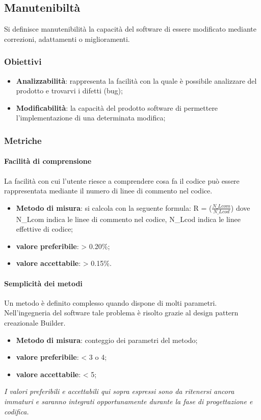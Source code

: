 \subsection{Manutenibiltà}
Si definisce manutenibilità la capacità del software di essere modificato mediante correzioni, adattamenti o miglioramenti.

\subsubsection{Obiettivi}
\begin{itemize}
\item \textbf{Analizzabilità}: rappresenta la facilità con la quale è possibile analizzare del prodotto e trovarvi i difetti (bug);
\item \textbf{Modificabilità}: la capacità del prodotto software di permettere l'implementazione di una determinata modifica;
\end{itemize}

\subsubsection{Metriche}

\paragraph{Facilità di comprensione}
La facilità con cui l’utente riesce a comprendere cosa fa il codice può essere rappresentata mediante il numero di linee di commento nel codice.
\begin{itemize}
\item \textbf{Metodo di misura}: si calcola con la seguente formula:
R = ($\frac{N\_Lcom}{N\_Lcod}$)
dove N\_Lcom indica le linee di commento nel codice, N\_Lcod indica le linee effettive di codice;
\item \textbf{valore preferibile}: > 0.20\%;
\item \textbf{valore accettabile}: > 0.15\%.
\end{itemize}

\paragraph{Semplicità dei metodi}
Un metodo è definito complesso quando dispone di molti parametri. Nell'ingegneria del software tale problema è risolto grazie al design pattern creazionale Builder.
\begin{itemize}
\item \textbf{Metodo di misura}: conteggio dei parametri del metodo;
\item \textbf{valore preferibile}: < 3 o 4;
\item \textbf{valore accettabile}: < 5;
\end{itemize}

\textit{I valori preferibili e accettabili qui sopra espressi sono da ritenersi ancora immaturi e saranno integrati opportunamente durante la fase di progettazione e codifica.}
 


